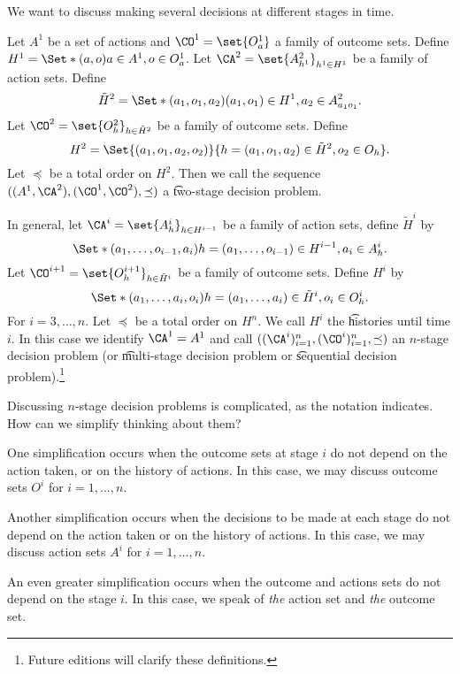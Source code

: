 

We want to discuss making several decisions at different stages in time.


Let $A^{1}$ be a set of actions and $\CO^1 = \set{O^{1}_a}$ a family of outcome sets.
Define $H^1 = \Set*{(a, o)}{a \in A^1, o \in O^{1}_a}$.
Let $\CA^2 = \set{A^{2}_{h^1}}_{h^1 \in H^1}$ be a family of action sets.
Define
\[
	\tilde{H}^{2} = \Set*{(a_1, o_1, a_2)}{(a_1, o_1) \in H^1, a_2 \in A^{2}_{a_1o_1}}.
\]
Let $\CO^2 = \set{O^{2}_{h}}_{h \in \tilde{H}^2}$ be a family of outcome sets.
Define
\[
	H^2 = \Set{(a_1, o_1, a_2, o_2)}{h = (a_1, o_1, a_2) \in \tilde{H}^2, o_2 \in O_{h}}.
\]
Let $\preceq$ be a total order on $H^2$.
Then we call the sequence $((A^1, \CA^2), (\CO^1, \CO^2), \preceq)$ a \t{two-stage decision problem}.


In general, let $\CA^{i} = \set{A^i_{h}}_{h \in H^{i-1}}$ be a family of action sets, define $\tilde{H}^i$ by
\[
 \Set*{(a_1, \dots, o_{i-1}, a_i)}{h = (a_1, \dots, o_{i-1}) \in H^{i-1}, a_i \in A^i_{h}}.
\]
Let $\CO^{i+1} = \set{O^{i+1}_{h}}_{h \in \tilde{H}^{i}}$ be a family of outcome sets. Define $H^{i}$ by
\[
 \Set*{(a_1, \dots, a_i, o_i)}{h = (a_1, \dots, a_i) \in \tilde{H}^{i}, o_i \in O^i_{h}}.
\]
For $i = 3, \dots, n$.
Let $\preceq$ be a total order on $H^{n}$.
We call $H^i$ the \t{histories until time $i$}.
In this case we identify $\CA^1 = A^1$ and call $((\CA^i)_{i = 1}^{n}, (\CO^i)_{i = 1}^{n}, \preceq)$ an \t{$n$-stage decision problem} (or \t{multi-stage decision problem} or \t{sequential decision problem}).\footnote{Future editions will clarify these definitions.}


Discussing $n$-stage decision problems is complicated, as the notation indicates.
How can we simplify thinking about them?

One simplification occurs when the outcome sets at stage $i$ do not depend on the action taken, or on the history of actions.
In this case, we may discuss outcome sets $O^i$ for $i = 1, \dots, n$.

Another simplification occurs when the decisions to be made at each stage do not depend on the action taken or on the history of actions.
In this case, we may discuss action sets $A^i$ for $i = 1, \dots, n$.

An even greater simplification occurs when the outcome and actions sets do not depend on the stage $i$.
In this case, we speak of \textit{the} action set and \textit{the} outcome set.

